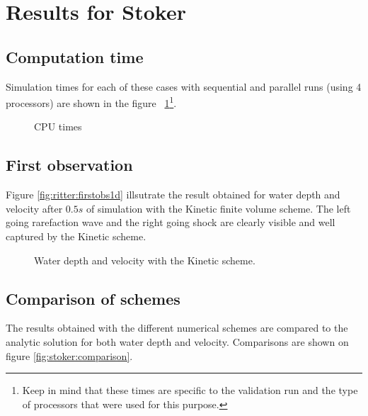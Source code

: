 \section{Results for Stoker}

\subsection{Computation time}

Simulation times for each of these cases with sequential and parallel runs (using 4 processors) are shown in the figure ~\ref{fig:stoker:cputime}\footnote{Keep in mind that these times
are specific to the validation run and the type of processors that were used for this purpose.}.

\begin{figure}[h!]
  \centering
  \caption{CPU times}\label{fig:stoker:cputime}
\end{figure}

\subsection{First observation}

Figure \ref{fig:ritter:firstobs1d} illsutrate the result obtained for water depth and velocity after $0.5s$ of
simulation with the Kinetic finite volume scheme. The left going rarefaction wave and the right going shock are
clearly visible and well captured by the Kinetic scheme.

\begin{figure}[H]
\begin{minipage}[t]{0.5\textwidth}
 \centering
\end{minipage}%
\begin{minipage}[t]{0.5\textwidth}
 \centering
\end{minipage}
  \caption{Water depth and velocity with the Kinetic scheme.}
  \label{fig:stoker:firstobs1d}
\end{figure}

\subsection{Comparison of schemes}

The results obtained with the different numerical schemes are compared to the analytic solution for both
water depth and velocity. Comparisons are shown on figure \ref{fig:stoker:comparison}.

